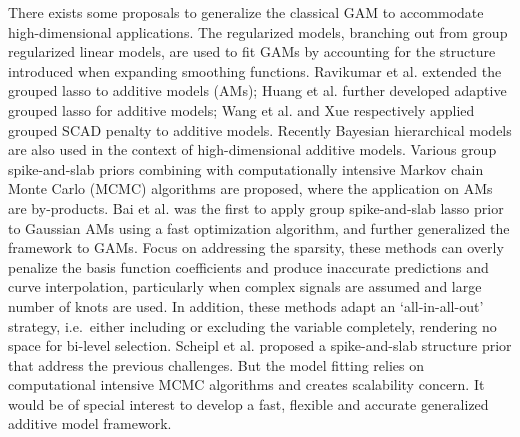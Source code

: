 \documentclass[AMA,STIX1COL,]{WileyNJD-v2}
\begin{document}
There exists some proposals to generalize the classical GAM to
accommodate high-dimensional applications. The regularized models,
branching out from group regularized linear models, are used to fit GAMs
by accounting for the structure introduced when expanding smoothing
functions. Ravikumar et al. \citep{Ravikumar2009} extended the grouped
lasso \citep{Yuan2006} to additive models (AMs); Huang et al.
\citep{Huang2010} further developed adaptive grouped lasso for additive
models; Wang et al. \citep{Wang2007} and Xue \citep{Xue2009}
respectively applied grouped SCAD penalty \citep{Fan2001} to additive
models. Recently Bayesian hierarchical models are also used in the
context of high-dimensional additive models. Various group
spike-and-slab priors combining with computationally intensive Markov
chain Monte Carlo (MCMC) algorithms \citep{Xu2015, Yang2020} are
proposed, where the application on AMs are by-products. Bai et al.
\citep{Bai2020} was the first to apply group spike-and-slab lasso prior
to Gaussian AMs using a fast optimization algorithm, and further
generalized the framework to GAMs\citep{Bai2021}. Focus on addressing
the sparsity, these methods can overly penalize the basis function
coefficients and produce inaccurate predictions and curve interpolation,
particularly when complex signals are assumed and large number of knots
are used. \citep{Scheipl2013} In addition, these methods adapt an
`all-in-all-out' strategy, i.e.~either including or excluding the
variable completely, rendering no space for bi-level selection. Scheipl
et al. \citep{Scheipl2012} proposed a spike-and-slab structure prior
that address the previous challenges. But the model fitting relies on
computational intensive MCMC algorithms and creates scalability concern.
It would be of special interest to develop a fast, flexible and accurate
generalized additive model framework.
\end{document}

